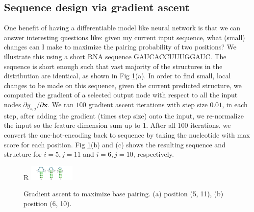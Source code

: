 \documentclass{article}
\begin{document}
%
%

\subsection{Sequence design via gradient ascent}

One benefit of having a differentiable model like neural network is that we can answer interesting questions like:
given my current input sequence, what (small) changes can I make to maximize the pairing probability of two positions?
We illustrate this using a short RNA sequence GAUCACCUUUGGAUC.
The sequence is short enough such that vast majority of the structures in the distribution are identical,
as shown in Fig \ref{fig:gradient_ascent}(a).
In order to find small, local changes to be made on this sequence,
given the current predicted structure,
we computed the gradient of a selected output node
with respect to all the input nodes ${\partial y_{i,j}}/{\partial \bm{x}}$.
We ran $100$ gradient ascent iterations with step size $0.01$,
in each step, after adding the gradient (times step size) onto the input,
we re-normalize the input so the feature dimension sum up to 1.
After all $100$ iterations, we convert the one-hot-encoding back to sequence
by taking the nucleotide with max score for each position.
Fig \ref{fig:gradient_ascent}(b) and (c) shows the resulting sequence and structure
for $i=5, j=11$ and $i=6, j=10$, respectively.



\begin{figure}{R}
    \centering
    \includegraphics[width=0.2\textwidth]{plot/gradient_ascent.pdf}
    \caption{Gradient ascent to maximize base pairing. (a) position (5, 11), (b) position (6, 10).}
    \vspace{-8em}
    \label{fig:gradient_ascent}
    \centering
\end{figure}


\end{document}
